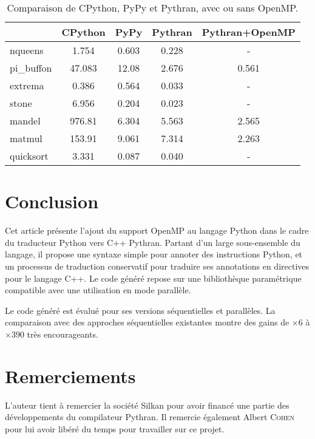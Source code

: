 \documentclass[renpar]{compas2013}
\begin{document}
\begin{table}
	\centering
  \begin{tabular}{l|c|c|c|c}
				&CPython	&	PyPy	&	Pythran	&	Pythran+OpenMP\\
	  \hline
	  \hline
	nqueens		&1.754		&	0.603	&	0.228	&	-		  \\
	pi\_buffon	&47.083		&	12.08	&	2.676	&	0.561		\\
	extrema		&0.386		&	0.564	&	0.033	&	-\\
	stone		&6.956		&	0.204	&	0.023	&	-\\
	mandel		&976.81		&	6.304	&	5.563	&	2.565\\
	matmul		&153.91		&	9.061	&	7.314	&	2.263\\
	quicksort	&3.331		&	0.087	&	0.040	&	-\\
  \end{tabular}

  \caption{Comparaison de CPython, PyPy et Pythran, avec ou sans OpenMP.}
  \label{tbl:pythran-vs-cpython}
\end{table}

\section{Conclusion}

Cet article présente l'ajout du support OpenMP au langage Python dans le
cadre du traducteur Python vers C++ Pythran. Partant d'un large
sous-ensemble du langage, il propose une syntaxe simple pour annoter des
instructions Python, et un processus de traduction conservatif pour
traduire ses annotations en directives pour le langage C++. Le code généré
repose sur une bibliothèque paramétrique compatible avec une utilisation
en mode parallèle.

Le code généré est évalué pour ses versions séquentielles et parallèles. La
comparaison avec des approches séquentielles existantes montre des gains
de $\times 6$ à $\times 390$ très encourageants.



\section{Remerciements}

L'auteur tient à remercier la société Silkan pour avoir financé une partie des
développements du compilateur Pythran. Il remercie également Albert
\textsc{Cohen} pour lui avoir libéré du temps pour travailler sur ce projet.
\end{document}
